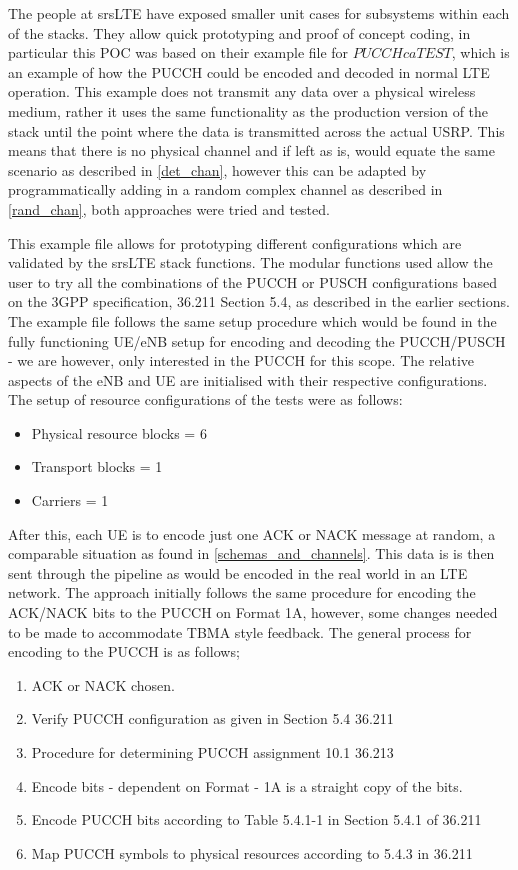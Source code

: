 \documentclass{article}
\begin{document}
The people at srsLTE have exposed smaller unit cases for subsystems within each of the stacks. They allow quick prototyping and proof of concept coding, in particular this POC was based on their example file for $PUCCH ca TEST$, which is an example of how the PUCCH could be encoded and decoded in normal LTE operation. This example does not transmit any data over a physical wireless medium, rather it uses the same functionality as the production version of the stack until the point where the data is transmitted across the actual USRP. This means that there is no physical channel and if left as is, would equate the same scenario as described in \cref{det_chan}, however this can be adapted by programmatically adding in a random complex channel as described in \cref{rand_chan}, both approaches were tried and tested. 

This example file allows for prototyping different configurations which are validated by the srsLTE stack functions. The modular functions used allow the user to try all the combinations of the PUCCH or PUSCH configurations based on the 3GPP specification, 36.211 Section 5.4, as described in the earlier sections. The example file follows the same setup procedure which would be found in the fully functioning UE/eNB setup for encoding and decoding the PUCCH/PUSCH - we are however, only interested in the PUCCH for this scope. The relative aspects of the eNB and UE are initialised with their respective configurations. The setup of resource configurations of the tests were as follows:

\begin{itemize}
    \item Physical resource blocks = 6
    \item Transport blocks = 1
    \item Carriers = 1
\end{itemize}

After this, each UE is to encode just one ACK or NACK message at random, a comparable situation as found in \cref{schemas_and_channels}. This data is is then sent through the pipeline as would be encoded in the real world in an LTE network. The approach initially follows the same procedure for encoding the ACK/NACK bits to the PUCCH on Format 1A, however, some changes needed to be made to accommodate TBMA style feedback. The general process for encoding to the PUCCH is as follows;

\begin{enumerate}
\label{encode_pucch_proc}
    \item ACK or NACK chosen.
    \item Verify PUCCH configuration as given in Section 5.4 36.211 
    \item Procedure for determining PUCCH assignment 10.1 36.213
    \item Encode bits - dependent on Format - 1A is a straight copy of the bits. 
    \item Encode PUCCH bits according to Table 5.4.1-1 in Section 5.4.1 of 36.211
    \item Map PUCCH symbols to physical resources according to 5.4.3 in 36.211
\end{enumerate}
 
\end{document}
